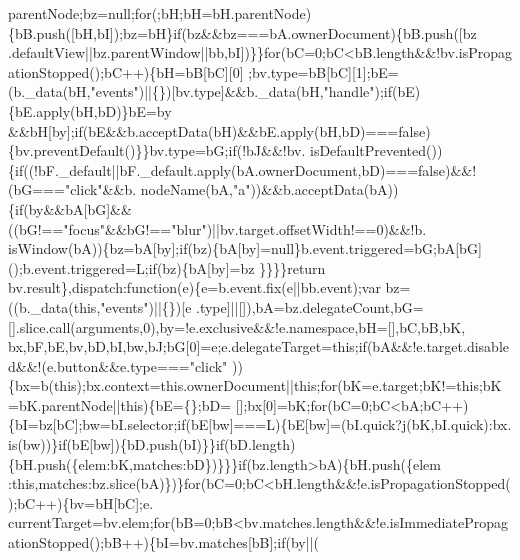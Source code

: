 \begin{DoxyCode}
      parentNode;bz=null;\textcolor{keywordflow}{for}(;bH;bH=bH.parentNode)\{bB.push([bH,bI]);bz=bH\}\textcolor{keywordflow}{if}(bz&&bz===bA.ownerDocument)\{bB.push([bz
      .defaultView||bz.parentWindow||bb,bI])\}\}\textcolor{keywordflow}{for}(bC=0;bC<bB.length&&!bv.isPropagationStopped();bC++)\{bH=bB[bC][0]
      ;bv.type=bB[bC][1];bE=(b.\_data(bH,\textcolor{stringliteral}{"events"})||\{\})[bv.type]&&b.\_data(bH,\textcolor{stringliteral}{"handle"});\textcolor{keywordflow}{if}(bE)\{bE.apply(bH,bD)\}bE=by
      &&bH[by];\textcolor{keywordflow}{if}(bE&&b.acceptData(bH)&&bE.apply(bH,bD)===\textcolor{keyword}{false})\{bv.preventDefault()\}\}bv.type=bG;\textcolor{keywordflow}{if}(!bJ&&!bv.
      isDefaultPrevented())\{\textcolor{keywordflow}{if}((!bF.\_default||bF.\_default.apply(bA.ownerDocument,bD)===\textcolor{keyword}{false})&&!(bG===\textcolor{stringliteral}{"click"}&&b.
      nodeName(bA,\textcolor{stringliteral}{"a"}))&&b.acceptData(bA))\{\textcolor{keywordflow}{if}(by&&bA[bG]&&((bG!==\textcolor{stringliteral}{"focus"}&&bG!==\textcolor{stringliteral}{"blur"})||bv.target.offsetWidth!==0)&&!b.
      isWindow(bA))\{bz=bA[by];\textcolor{keywordflow}{if}(bz)\{bA[by]=null\}b.event.triggered=bG;bA[bG]();b.event.triggered=L;\textcolor{keywordflow}{if}(bz)\{bA[by]=bz
      \}\}\}\}\textcolor{keywordflow}{return} bv.result\},dispatch:\textcolor{keyword}{function}(e)\{e=b.event.fix(e||bb.event);var bz=((b.\_data(\textcolor{keyword}{this},\textcolor{stringliteral}{"events"})||\{\})[e
      .type]||[]),bA=bz.delegateCount,bG=[].slice.call(arguments,0),by=!e.exclusive&&!e.namespace,bH=[],bC,bB,bK,
      bx,bF,bE,bv,bD,bI,bw,bJ;bG[0]=e;e.delegateTarget=\textcolor{keyword}{this};\textcolor{keywordflow}{if}(bA&&!e.target.disabled&&!(e.button&&e.type===\textcolor{stringliteral}{"click"}
      ))\{bx=b(\textcolor{keyword}{this});bx.context=this.ownerDocument||\textcolor{keyword}{this};\textcolor{keywordflow}{for}(bK=e.target;bK!=\textcolor{keyword}{this};bK=bK.parentNode||\textcolor{keyword}{this})\{bE=\{\};bD=
      [];bx[0]=bK;\textcolor{keywordflow}{for}(bC=0;bC<bA;bC++)\{bI=bz[bC];bw=bI.selector;\textcolor{keywordflow}{if}(bE[bw]===L)\{bE[bw]=(bI.quick?j(bK,bI.quick):bx.
      is(bw))\}if(bE[bw])\{bD.push(bI)\}\}\textcolor{keywordflow}{if}(bD.length)\{bH.push(\{elem:bK,matches:bD\})\}\}\}\textcolor{keywordflow}{if}(bz.length>bA)\{bH.push(\{elem
      :\textcolor{keyword}{this},matches:bz.slice(bA)\})\}\textcolor{keywordflow}{for}(bC=0;bC<bH.length&&!e.isPropagationStopped();bC++)\{bv=bH[bC];e.
      currentTarget=bv.elem;\textcolor{keywordflow}{for}(bB=0;bB<bv.matches.length&&!e.isImmediatePropagationStopped();bB++)\{bI=bv.matches[bB];\textcolor{keywordflow}{if}(by||(

\end{DoxyCode}
